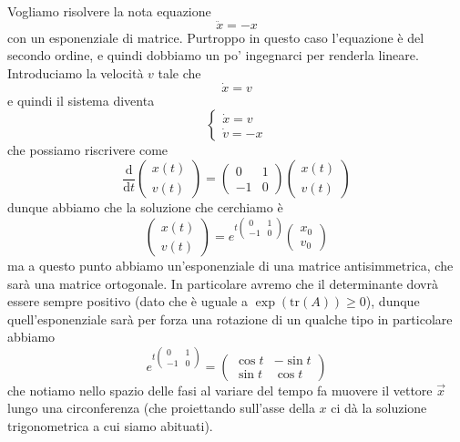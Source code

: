 \documentclass[11pt]{scrartcl}
\newcommand{\dif}{\text{d}}
\begin{document}
	\begin{example}
		Vogliamo risolvere la nota equazione
		$$\ddot{x}=-x$$
		con un esponenziale di matrice. Purtroppo in questo caso l'equazione è del secondo ordine, e quindi dobbiamo un po' ingegnarci per renderla lineare. Introduciamo la velocità $v$ tale che
		$$\dot{x}=v$$
		e quindi il sistema diventa
		$$
		\begin{cases}
			\dot{x}=v \\
			\dot{v}=-x
		\end{cases}
		$$
		che possiamo riscrivere come
		$$
		\frac{\dif}{\dif t}
		\begin{pmatrix}
			x(t)\\
			v(t)
		\end{pmatrix}
		=
		\begin{pmatrix}
			0 & 1 \\
			-1 & 0
		\end{pmatrix}
		\begin{pmatrix}
			x(t) \\
			v(t)
		\end{pmatrix}
		$$
		dunque abbiamo che la soluzione che cerchiamo è
		$$
		\begin{pmatrix}
			x(t) \\
			v(t)
		\end{pmatrix}
		=
		e^{t\begin{pmatrix}
				0 & 1 \\
				-1 & 0
		\end{pmatrix}}
		\begin{pmatrix}
			x_0 \\
			v_0
		\end{pmatrix}
		$$
		ma a questo punto abbiamo un'esponenziale di una matrice antisimmetrica, che sarà una matrice ortogonale. In particolare avremo che il determinante dovrà essere sempre positivo (dato che è uguale a $\exp\left(\text{tr}(A)\right)\ge 0$), dunque quell'esponenziale sarà per forza una rotazione di un qualche tipo in particolare abbiamo
		$$e^{t\begin{pmatrix}
				0 & 1 \\
				-1 & 0
		\end{pmatrix}}=\begin{pmatrix}
		\cos t & -\sin t \\
		\sin t & \cos t
	\end{pmatrix}$$
	che notiamo nello spazio delle fasi al variare del tempo fa muovere il vettore $\vec{x}$ lungo una circonferenza (che proiettando sull'asse della $x$ ci dà la soluzione trigonometrica a cui siamo abituati).
	\end{example}
\end{document}
